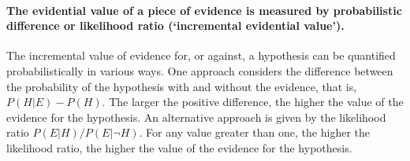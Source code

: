 \documentclass[10pt]{article}
\begin{document}
\paragraph{The evidential value of a piece of evidence is measured by probabilistic difference or likelihood ratio (`incremental evidential value').}
The incremental value of evidence for, or against, a hypothesis 
can be quantified probabilistically in various ways. 
One approach considers the difference between the probability of 
the hypothesis with and without the evidence, that is, $P(H | E) - P(H)$.
The larger the positive difference, the higher the value of the evidence 
for the hypothesis. 
An alternative approach is given by the likelihood ratio $P(E|H)/P(E| \neg H)$. 
For any value greater than one, the higher the likelihood ratio, 
the higher the value of the evidence for the hypothesis. %
\end{document}
